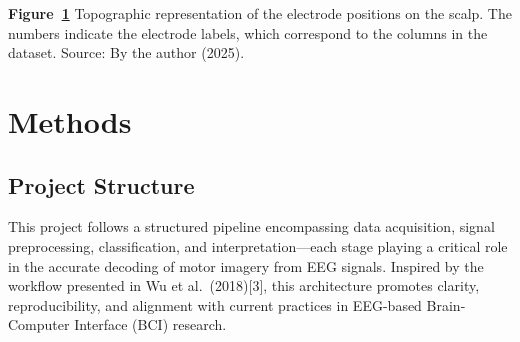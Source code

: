 \documentclass[
  letterpaper,
  DIV=11,
  numbers=noendperiod]{scrartcl}
\begin{document}
\begin{figure}


\caption{\label{fig-electrodesPositionsTopologic}}

\end{figure}%

\textbf{Figure~\ref{fig-electrodesPositionsTopologic}} Topographic
representation of the electrode positions on the scalp. The numbers
indicate the electrode labels, which correspond to the columns in the
dataset. Source: By the author (2025).

\section{Methods}\label{methods}

\subsection{Project Structure}\label{project-structure}

This project follows a structured pipeline encompassing data
acquisition, signal preprocessing, classification, and
interpretation---each stage playing a critical role in the accurate
decoding of motor imagery from EEG signals. Inspired by the workflow
presented in Wu et al.~(2018){[}3{]}, this architecture promotes
clarity, reproducibility, and alignment with current practices in
EEG-based Brain-Computer Interface (BCI) research.
\end{document}
